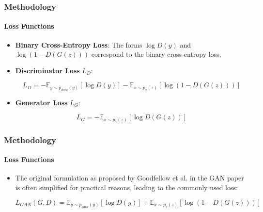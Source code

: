 \documentclass[aspectratio=169, lecture, amberg]{OTHAWbeamer}
\begin{document}
\begin{frame}[t]
    \frametitle{Methodology}
    \framesubtitle{Loss Functions}

    \begin{itemize}
        \item \textbf{Binary Cross-Entropy Loss}: The forms $\log D(y)$ and $\log (1 - D(G(z)))$ correspond to the binary cross-entropy loss.
        \vspace{0.4cm}
        \item \textbf{Discriminator Loss} $L_D$:
        \vspace{0.4cm}
        \begin{block}{}
            \begin{equation}
                L_D = -\mathbb{E}_{y \sim p_{data}(y)} [\log D(y)] - \mathbb{E}_{x \sim p_z(z)} [\log (1 - D(G(z)))]
            \end{equation}
            \end{block}
            \vspace{0.4cm}
        \item \textbf{Generator Loss} $L_G$:
        \begin{block}{}
            \begin{equation}
                L_G = -\mathbb{E}_{x \sim p_z(z)} [\log D(G(z))]
            \end{equation}
            \end{block}


    \end{itemize}

\end{frame}

\begin{frame}[t]
    \frametitle{Methodology}
    \framesubtitle{Loss Functions}

    \begin{itemize}

        \item The original formulation as proposed by Goodfellow et al. in the GAN paper is often simplified for practical reasons, leading to the commonly used loss:
        \vspace{0.4cm}
        \begin{block}{}
            \begin{equation}
                L_{GAN}(G,D) = \mathbb{E}_{y \sim p_{data}(y)} [\log D(y)] + \mathbb{E}_{x \sim p_z(z)} [\log (1 - D(G(z)))]
            \end{equation}
            \end{block}
    \end{itemize}


\end{frame}
\end{document}

